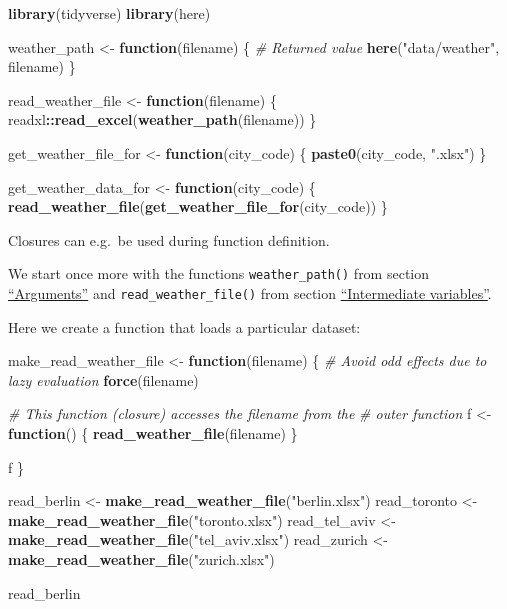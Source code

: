 \documentclass[]{book}
\newenvironment{Shaded}{\begin{snugshade}}{\end{snugshade}}
\newcommand{\CommentTok}[1]{\textcolor[rgb]{0.56,0.35,0.01}{\textit{#1}}}
\newcommand{\ControlFlowTok}[1]{\textcolor[rgb]{0.13,0.29,0.53}{\textbf{#1}}}
\newcommand{\KeywordTok}[1]{\textcolor[rgb]{0.13,0.29,0.53}{\textbf{#1}}}
\newcommand{\NormalTok}[1]{#1}
\newcommand{\OperatorTok}[1]{\textcolor[rgb]{0.81,0.36,0.00}{\textbf{#1}}}
\newcommand{\StringTok}[1]{\textcolor[rgb]{0.31,0.60,0.02}{#1}}
\begin{document}
\begin{Shaded}
\begin{Highlighting}[]
\KeywordTok{library}\NormalTok{(tidyverse)}
\KeywordTok{library}\NormalTok{(here)}

\NormalTok{weather_path <-}\StringTok{ }\ControlFlowTok{function}\NormalTok{(filename) \{}
  \CommentTok{# Returned value}
  \KeywordTok{here}\NormalTok{(}\StringTok{"data/weather"}\NormalTok{, filename)}
\NormalTok{\}}

\NormalTok{read_weather_file <-}\StringTok{ }\ControlFlowTok{function}\NormalTok{(filename) \{}
\NormalTok{  readxl}\OperatorTok{::}\KeywordTok{read_excel}\NormalTok{(}\KeywordTok{weather_path}\NormalTok{(filename))}
\NormalTok{\}}

\NormalTok{get_weather_file_for <-}\StringTok{ }\ControlFlowTok{function}\NormalTok{(city_code) \{}
  \KeywordTok{paste0}\NormalTok{(city_code, }\StringTok{".xlsx"}\NormalTok{)}
\NormalTok{\}}

\NormalTok{get_weather_data_for <-}\StringTok{ }\ControlFlowTok{function}\NormalTok{(city_code) \{}
  \KeywordTok{read_weather_file}\NormalTok{(}\KeywordTok{get_weather_file_for}\NormalTok{(city_code))}
\NormalTok{\}}
\end{Highlighting}
\end{Shaded}

Closures can e.g.~be used during function definition.

We start once more with the functions \texttt{weather\_path()} from section \protect\hyperlink{args}{``Arguments''} and \texttt{read\_weather\_file()} from section \protect\hyperlink{intermediate}{``Intermediate variables''}.

Here we create a function that loads a particular dataset:

\begin{Shaded}
\begin{Highlighting}[]
\NormalTok{make_read_weather_file <-}\StringTok{ }\ControlFlowTok{function}\NormalTok{(filename) \{}
  \CommentTok{# Avoid odd effects due to lazy evaluation}
  \KeywordTok{force}\NormalTok{(filename)}

  \CommentTok{# This function (closure) accesses the filename from the}
  \CommentTok{# outer function}
\NormalTok{  f <-}\StringTok{ }\ControlFlowTok{function}\NormalTok{() \{}
    \KeywordTok{read_weather_file}\NormalTok{(filename)}
\NormalTok{  \}}

\NormalTok{  f}
\NormalTok{\}}

\NormalTok{read_berlin <-}\StringTok{ }\KeywordTok{make_read_weather_file}\NormalTok{(}\StringTok{"berlin.xlsx"}\NormalTok{)}
\NormalTok{read_toronto <-}\StringTok{ }\KeywordTok{make_read_weather_file}\NormalTok{(}\StringTok{"toronto.xlsx"}\NormalTok{)}
\NormalTok{read_tel_aviv <-}\StringTok{ }\KeywordTok{make_read_weather_file}\NormalTok{(}\StringTok{"tel_aviv.xlsx"}\NormalTok{)}
\NormalTok{read_zurich <-}\StringTok{ }\KeywordTok{make_read_weather_file}\NormalTok{(}\StringTok{"zurich.xlsx"}\NormalTok{)}

\NormalTok{read_berlin}
\end{Highlighting}
\end{Shaded}
\end{document}
